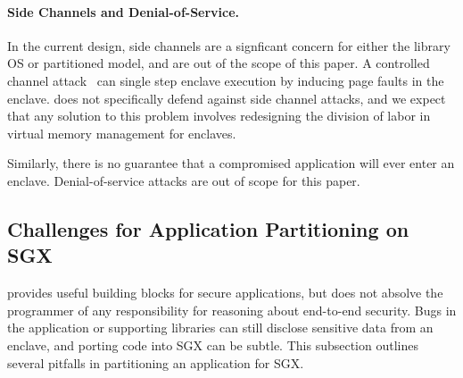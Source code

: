 
\paragraph{Side Channels and Denial-of-Service.}
In the current \sgx{} design, side channels are a signficant concern for either the library OS or partitioned model, and are out of the scope of this paper.
A controlled channel attack~ can single step enclave execution by inducing page faults
in the enclave.  \sysname{} does not specifically defend against side channel attacks,
and we expect that any solution to this problem involves redesigning the division of labor in virtual
memory management for enclaves.

Similarly, there is no guarantee that a compromised application will ever enter
an enclave.  Denial-of-service attacks are out of scope for this paper.


\subsection{Challenges for Application Partitioning on SGX}

\sgx{} provides useful building blocks for secure applications, but does not
absolve the programmer of any responsibility for reasoning about end-to-end security.
Bugs in the application or supporting libraries can still disclose sensitive data from an enclave,
and porting code into SGX can be subtle.
This subsection outlines several pitfalls in partitioning an application for SGX.


